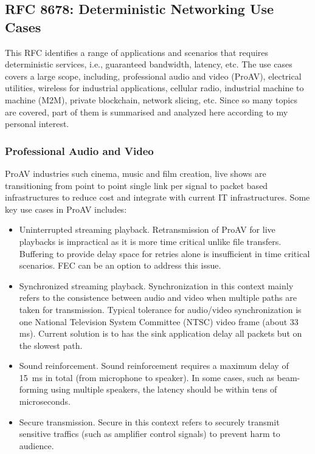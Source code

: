 \documentclass[12pt]{article}
\begin{document}
\subsection{RFC 8678: Deterministic Networking Use Cases~\cite{grossman2019deterministic}}
This RFC identifies a range of applications and scenarios that requires deterministic services, i.e., guaranteed bandwidth, latency, etc. The use cases covers a large scope, including, professional audio and video (ProAV), electrical utilities, wireless for industrial applications, cellular radio, industrial machine to machine (M2M), private blockchain, network slicing, etc. Since so many topics are covered, part of them is summarised and analyzed here according to my personal interest. 

\subsubsection{Professional Audio and Video}
ProAV industries such cinema, music and film creation, live shows are transitioning from point to point single link per signal to packet based infrastructures to reduce cost and integrate with current IT infrastructures. Some key use cases in ProAV includes:
\begin{itemize}
    \item Uninterrupted streaming playback. Retransmission of ProAV for live playbacks is impractical as it is more time critical unlike file transfers. Buffering to provide delay space for retries alone is insufficient in time critical scenarios. FEC can be an option to address this issue.
    \item Synchronized streaming playback. Synchronization in this context mainly refers to the consistence between audio and video when multiple paths are taken for transmission. Typical tolerance for audio/video synchronization is one National Television System Committee (NTSC) video frame (about 33 ms). Current solution is to has the sink application delay all packets but on the slowest path. 
    \item Sound reinforcement. Sound reinforcement requires a maximum delay of 15~ms in total (from microphone to speaker). In some cases, such as beam-forming using multiple speakers, the latency should be within tens of microseconds.
    \item Secure transmission. Secure in this context refers to securely transmit sensitive traffics (such as amplifier control signals) to prevent harm to audience.
\end{itemize}
\end{document}
